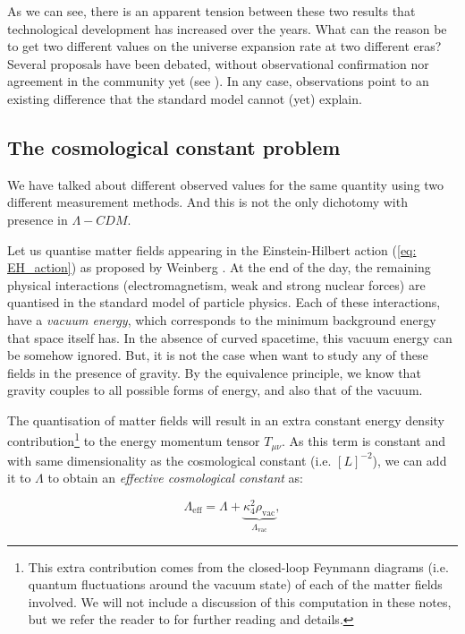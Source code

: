 \documentclass[11pt, a4paper]{article} %
\begin{document}
As we can see, there is an apparent tension between these two results that technological development has increased over the years. What can the reason be to get two different values on the universe expansion rate at two different eras? Several proposals have been debated, without observational confirmation nor agreement in the community yet (see \cite{di2021realm}). In any case, observations point to an existing difference that the standard model cannot (yet) explain.

\subsection*{The cosmological constant problem}

We have talked about different observed values for the same quantity using two different measurement methods. And this is not the only dichotomy with presence in $\Lambda-CDM$.

Let us quantise matter fields appearing in the Einstein-Hilbert action (\ref{eq: EH_action}) as proposed by Weinberg \cite{weinberg1989cosmological}. At the end of the day, the remaining physical interactions (electromagnetism, weak and strong nuclear forces) are quantised in the standard model of particle physics. Each of these interactions, have a \textit{vacuum energy}, which corresponds to the minimum background energy that space itself has. In the absence of curved spacetime, this vacuum energy can be somehow ignored. But, it is not the case when want to study any of these fields in the presence of gravity. By the equivalence principle, we know that gravity couples to all possible forms of energy, and also that of the vacuum.

The quantisation of matter fields will result in an extra constant energy density contribution\footnote{ This extra contribution comes from the closed-loop Feynmann diagrams (i.e. quantum fluctuations around the vacuum state) of each of the matter fields involved. We will not include a discussion of this computation in these notes, but we refer the reader to \cite{Martin_2012, padilla2015lectures} for further reading and details.} to the energy momentum tensor $T_{\mu\nu}$. As this term is constant and with same dimensionality as the cosmological constant (i.e. $[L]^{-2}$), we can add it to $\Lambda$ to obtain an \textit{effective cosmological constant} as:

\begin{equation}
	\Lambda_{\text{eff}} = \Lambda + \underbrace{\kappa^{2}_{4} \rho_{\text{vac}}}_{\Lambda_{\text{vac}}},
\end{equation}
\end{document}
